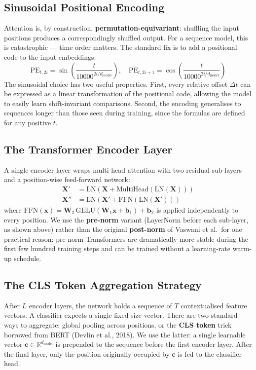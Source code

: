 \subsection{Sinusoidal Positional Encoding}
Attention is, by construction, \textbf{permutation-equivariant}: shuffling the input positions produces a correspondingly shuffled output. For a sequence model, this is catastrophic --- time order matters. The standard fix is to add a positional code to the input embeddings:
\begin{equation}
    \text{PE}_{t, 2i} = \sin\!\left( \frac{t}{10000^{2i / d_{\text{model}}}} \right), \quad
    \text{PE}_{t, 2i+1} = \cos\!\left( \frac{t}{10000^{2i / d_{\text{model}}}} \right)
\end{equation}
The sinusoidal choice has two useful properties. First, every relative offset $\Delta t$ can be expressed as a linear transformation of the positional code, allowing the model to easily learn shift-invariant comparisons. Second, the encoding generalises to sequences longer than those seen during training, since the formulas are defined for any positive $t$.

\subsection{The Transformer Encoder Layer}
A single encoder layer wraps multi-head attention with two residual sub-layers and a position-wise feed-forward network:
\begin{align}
    \mathbf{X}' &= \text{LN}(\mathbf{X} + \text{MultiHead}(\text{LN}(\mathbf{X}))) \\
    \mathbf{X}'' &= \text{LN}(\mathbf{X}' + \text{FFN}(\text{LN}(\mathbf{X}')))
\end{align}
where $\text{FFN}(\mathbf{x}) = \mathbf{W}_{2} \, \text{GELU}(\mathbf{W}_{1} \mathbf{x} + \mathbf{b}_{1}) + \mathbf{b}_{2}$ is applied independently to every position. We use the \textbf{pre-norm} variant (LayerNorm before each sub-layer, as shown above) rather than the original \textbf{post-norm} of Vaswani et al.\ for one practical reason: pre-norm Transformers are dramatically more stable during the first few hundred training steps and can be trained without a learning-rate warm-up schedule.

\subsection{The CLS Token Aggregation Strategy}
After $L$ encoder layers, the network holds a sequence of $T$ contextualised feature vectors. A classifier expects a single fixed-size vector. There are two standard ways to aggregate: global pooling across positions, or the \textbf{CLS token} trick borrowed from BERT (Devlin et al., 2018). We use the latter: a single learnable vector $\mathbf{c} \in \mathbb{R}^{d_{\text{model}}}$ is prepended to the sequence before the first encoder layer. After the final layer, only the position originally occupied by $\mathbf{c}$ is fed to the classifier head.

